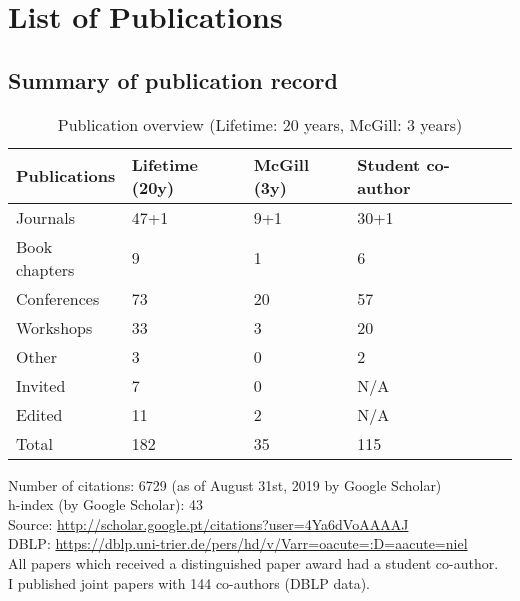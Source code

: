 \newpage
\section{List of Publications}
\label{sec:publication-list}


\subsection{Summary of publication record}

\begin{table}[htb]
\begin{tabular}{@{}lllll@{}}
\toprule
\textbf{Publications} & \textbf{Lifetime} (20y) & \textbf{McGill} (3y) & \textbf{Student co-author} \\ \midrule
Journals & 47+1 & 9+1 & 30+1 \\ %
Book chapters & 9 & 1 & 6  \\ %
Conferences & 73 & 20 & 57  \\ %
Workshops & 33 & 3 & 20  \\ %
Other & 3 & 0 & 2  \\ %
Invited & 7 & 0 & N/A   \\ %
Edited & 11 & 2 & N/A \\ \midrule
Total & 182 & 35 & 115 \\ %
\bottomrule
\end{tabular}
\caption{Publication overview (Lifetime: 20 years, McGill: 3 years)}
\label{tab:publication-overview}
\end{table}

\noindent
Number of citations: 6729 (as of August 31st, 2019 by Google Scholar) \\
h-index (by Google Scholar): 43 \\
Source: \url{http://scholar.google.pt/citations?user=4Ya6dVoAAAAJ}  \\
DBLP: \url{https://dblp.uni-trier.de/pers/hd/v/Varr=oacute=:D=aacute=niel}  \\
All papers which received a distinguished paper award had a student co-author. \\
I published joint papers with 144 co-authors (DBLP data). \\


